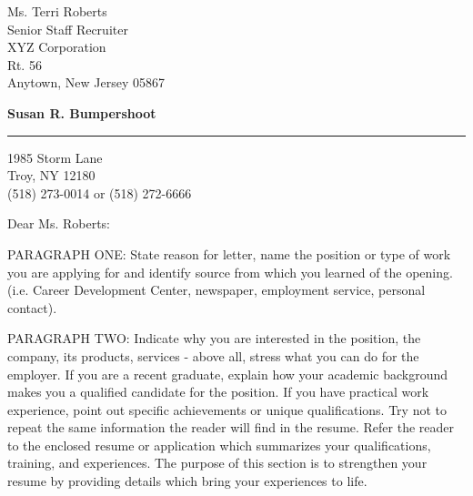 \topmargin=-1in    %
\textheight=8.5in    %
\oddsidemargin=0pt   %
\textwidth=6.5in     %




\signature{Susan R. Bumpershoot}           %
\longindentation=0pt                       %
\let\raggedleft\raggedright                %
 
 
\begin{letter}{Ms. Terri Roberts \\
Senior Staff Recruiter \\
XYZ Corporation \\
Rt. 56 \\
Anytown, New Jersey 05867}

\begin{center}
{\large\bf Susan R. Bumpershoot} 
\end{center}
\medskip\hrule height 1pt
\begin{center}
{1985 Storm Lane \\   Troy, NY 12180 \\ (518) 273-0014 or (518) 272-6666} 
\end{center} \vfill %
 
 
\opening{Dear Ms. Roberts:} 
 
\noindent PARAGRAPH ONE: State reason for letter, name the position or type 
of work you are applying for and identify source from  which  you 
learned   of   the  opening.  (i.e.  Career  Development  Center, 
newspaper, employment service, personal contact). 
 
\noindent PARAGRAPH  TWO:  Indicate why you are interested in the position, 
the company, its products, services - above all, stress what  you 
can  do  for  the employer. If you are a recent graduate, explain 
how your academic background makes you a qualified candidate  for 
the  position.  If  you have practical work experience, point out 
specific achievements or unique qualifications. Try not to repeat 
the  same  information  the reader will find in the resume. Refer 
the reader to the enclosed resume or application which summarizes 
your  qualifications,  training,  and experiences. The purpose of 
this section is to strengthen your resume  by  providing  details 
which bring your experiences to life. 
 

\end{letter}
